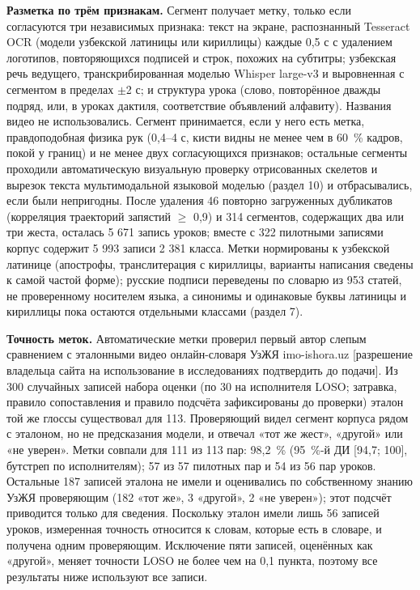 \documentclass[a4paper,fleqn]{cas-dc}
\begin{document}
\textbf{Разметка по трём признакам.} Сегмент получает метку, только если согласуются три независимых признака: текст на экране, распознанный Tesseract OCR \cite{2007_smith_tesseract} (модели узбекской латиницы или кириллицы) каждые 0,5 с с удалением логотипов, повторяющихся подписей и строк, похожих на субтитры; узбекская речь ведущего, транскрибированная моделью Whisper large-v3 \cite{2023_radford_whisper} и выровненная с сегментом в пределах $\pm$2 с; и структура урока (слово, повторённое дважды подряд, или, в уроках дактиля, соответствие объявлений алфавиту). Названия видео не использовались. Сегмент принимается, если у него есть метка, правдоподобная физика рук (0,4--4 с, кисти видны не менее чем в 60~\% кадров, покой у границ) и не менее двух согласующихся признаков; остальные сегменты проходили автоматическую визуальную проверку отрисованных скелетов и вырезок текста мультимодальной языковой моделью (раздел 10) и отбрасывались, если были непригодны. После удаления 46 повторно загруженных дубликатов (корреляция траекторий запястий $\geq$ 0,9) и 314 сегментов, содержащих два или три жеста, осталась 5 671 запись уроков; вместе с 322 пилотными записями корпус содержит 5 993 записи 2 381 класса. Метки нормированы к узбекской латинице (апострофы, транслитерация с кириллицы, варианты написания сведены к самой частой форме); русские подписи переведены по словарю из 953 статей, не проверенному носителем языка, а синонимы и одинаковые буквы латиницы и кириллицы пока остаются отдельными классами (раздел 7).

\textbf{Точность меток.} Автоматические метки проверил первый автор слепым сравнением с эталонными видео онлайн-словаря УзЖЯ imo-ishora.uz {\color{red}[разрешение владельца сайта на использование в исследованиях подтвердить до подачи]}. Из 300 случайных записей набора оценки (по 30 на исполнителя LOSO; затравка, правило сопоставления и правило подсчёта зафиксированы до проверки) эталон той же глоссы существовал для 113. Проверяющий видел сегмент корпуса рядом с эталоном, но не предсказания модели, и отвечал «тот же жест», «другой» или «не уверен». Метки совпали для 111 из 113 пар: 98,2~\% (95~\%-й ДИ {[}94,7; 100{]}, бутстреп по исполнителям); 57 из 57 пилотных пар и 54 из 56 пар уроков. Остальные 187 записей эталона не имели и оценивались по собственному знанию УзЖЯ проверяющим (182 «тот же», 3 «другой», 2 «не уверен»); этот подсчёт приводится только для сведения. Поскольку эталон имели лишь 56 записей уроков, измеренная точность относится к словам, которые есть в словаре, и получена одним проверяющим. Исключение пяти записей, оценённых как «другой», меняет точности LOSO не более чем на 0,1 пункта, поэтому все результаты ниже используют все записи.
\end{document}

